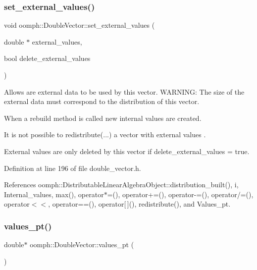 \subsubsection{\texorpdfstring{set\+\_\+external\+\_\+values()}{set\_external\_values()}\hspace{0.1cm}{\footnotesize\ttfamily [2/2]}}
{\footnotesize\ttfamily void oomph\+::\+Double\+Vector\+::set\+\_\+external\+\_\+values (\begin{DoxyParamCaption}\item[{double $\ast$}]{external\+\_\+values,  }\item[{bool}]{delete\+\_\+external\+\_\+values }\end{DoxyParamCaption})\hspace{0.3cm}{\ttfamily [inline]}}



Allows are external data to be used by this vector. W\+A\+R\+N\+I\+NG\+: The size of the external data must correspond to the distribution of this vector. 


\begin{DoxyEnumerate}
\item When a rebuild method is called new internal values are created.
\item It is not possible to redistribute(...) a vector with external values .
\item External values are only deleted by this vector if delete\+\_\+external\+\_\+values = true. 
\end{DoxyEnumerate}

Definition at line 196 of file double\+\_\+vector.\+h.



References oomph\+::\+Distributable\+Linear\+Algebra\+Object\+::distribution\+\_\+built(), i, Internal\+\_\+values, max(), operator$\ast$=(), operator+=(), operator-\/=(), operator/=(), operator$<$$<$, operator==(), operator\mbox{[}$\,$\mbox{]}(), redistribute(), and Values\+\_\+pt.

\mbox{\label{classoomph_1_1DoubleVector_a8c3dcdf8a602a1f266bbe72d98fde2e7}} 
\subsubsection{\texorpdfstring{values\+\_\+pt()}{values\_pt()}\hspace{0.1cm}{\footnotesize\ttfamily [1/2]}}
{\footnotesize\ttfamily double$\ast$ oomph\+::\+Double\+Vector\+::values\+\_\+pt (\begin{DoxyParamCaption}{ }\end{DoxyParamCaption})\hspace{0.3cm}{\ttfamily [inline]}}



